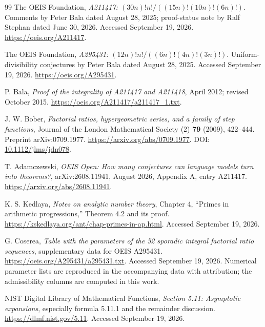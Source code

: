 \documentclass[11pt]{article}
\theoremstyle{definition}
\theoremstyle{remark}
\begin{document}
\clearpage
\begin{thebibliography}{99}
The OEIS Foundation, \emph{A211417: $(30n)!n!/((15n)!(10n)!(6n)!)$}.
Comments by Peter Bala dated August 28, 2025; proof-status note by
Ralf Stephan dated June 30, 2026. Accessed September 19, 2026.
\url{https://oeis.org/A211417}.

The OEIS Foundation, \emph{A295431: $(12n)!n!/((6n)!(4n)!(3n)!)$}.
Uniform-divisibility conjectures by Peter Bala dated August 28, 2025.
Accessed September 19, 2026. \url{https://oeis.org/A295431}.

P. Bala, \emph{Proof of the integrality of A211417 and A211418}, April
2012; revised October 2015.
\url{https://oeis.org/A211417/a211417_1.txt}.

J. W. Bober, \emph{Factorial ratios, hypergeometric series, and a family
of step functions}, Journal of the London Mathematical Society (2)
\textbf{79} (2009), 422--444. Preprint arXiv:0709.1977.
\url{https://arxiv.org/abs/0709.1977}.
DOI: \href{https://doi.org/10.1112/jlms/jdn078}{10.1112/jlms/jdn078}.

T. Adamczewski, \emph{OEIS Open: How many conjectures can language
models turn into theorems?}, arXiv:2608.11941, August 2026,
Appendix A, entry A211417.
\url{https://arxiv.org/abs/2608.11941}.

K. S. Kedlaya, \emph{Notes on analytic number theory}, Chapter 4,
``Primes in arithmetic progressions,'' Theorem 4.2 and its proof.
\url{https://kskedlaya.org/ant/chap-primes-in-ap.html}.
Accessed September 19, 2026.

G. Coserea, \emph{Table with the parameters of the 52 sporadic integral
factorial ratio sequences}, supplementary data for OEIS A295431.
\url{https://oeis.org/A295431/a295431.txt}.
Accessed September 19, 2026. Numerical parameter lists are reproduced
in the accompanying data with attribution; the admissibility columns
are computed in this work.

NIST Digital Library of Mathematical Functions, \emph{Section 5.11:
Asymptotic expansions}, especially formula 5.11.1 and the remainder
discussion. \url{https://dlmf.nist.gov/5.11}.
Accessed September 19, 2026.


\end{thebibliography}
\end{document}
